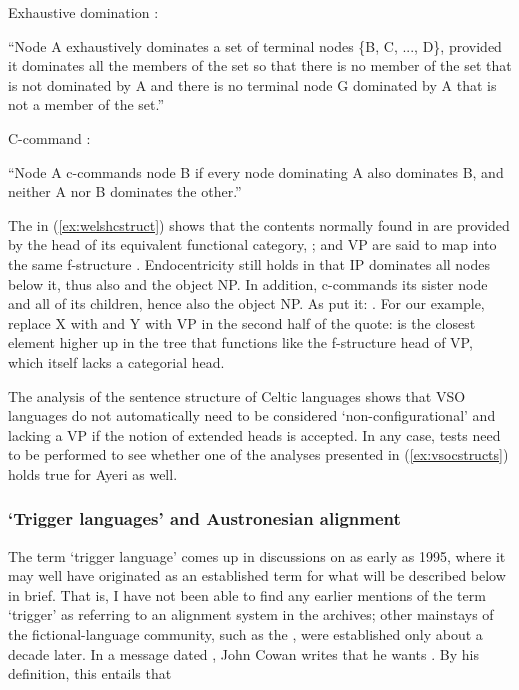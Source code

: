 \pex
\a Exhaustive domination \citep[121]{carnie2013}:\smallskip

	``Node A exhaustively dominates a set of terminal nodes \{B, C, ..., D\},
	provided it dominates all the members of the set so that there is no
	member of the set that is not dominated by A and there is no terminal node
	G dominated by A that is not a member of the set.''

\a C-command \citep[127]{carnie2013}:\smallskip

	``Node A c-commands node B if every node dominating A also dominates B, and
	neither A nor B dominates the other.''
\xe

The \Avm{} in (\ref{ex:welshcstruct}) shows that the contents normally found in
 are provided by the head of its equivalent functional category,
;  and VP are said to map into the same f-structure \citep
[136]{bresnan2016}. Endocentricity still holds in that IP dominates all nodes
below it, thus also  and the object NP. In addition, 
c-commands its sister node and all of its children, hence also the object NP.
As \citet{bresnan2016} put it: . For our example, replace X with
 and Y with VP in the second half of the quote:  is the
closest element higher up in the tree that functions like the f-structure head
of VP, which itself lacks a categorial head.

The analysis of the sentence structure of Celtic languages shows that VSO
languages do not automatically need to be considered `non-configurational' and
lacking a VP if the notion of extended heads is accepted. In any case, tests
need to be performed to see whether one of the analyses presented in
(\ref{ex:vsocstructs}) holds true for Ayeri as well.

\subsubsection{`Trigger languages' and Austronesian alignment}

The term `trigger language' comes up in discussions on  as
early as 1995, where it may well have originated as an established term for
what will be described below in brief. That is, I have not been able to find
any earlier mentions of the term `trigger' as referring to an alignment system
in the archives; other mainstays of the fictional-language community, such as
the , were established only about a decade later. In a message
dated , John Cowan writes that he wants
. By his definition, this entails that

